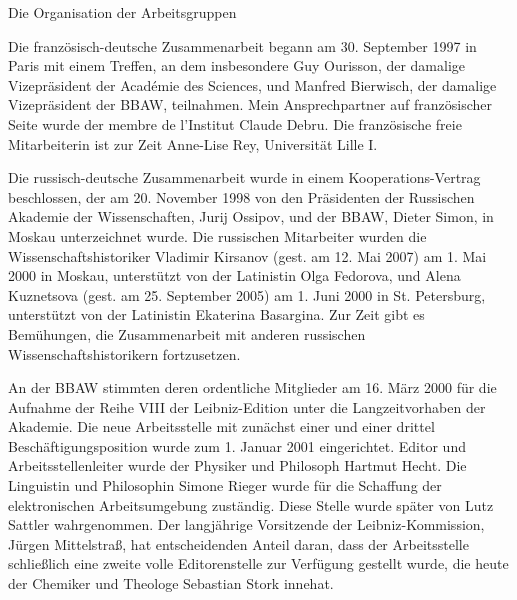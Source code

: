 Die Organisation der Arbeitsgruppen\par\vspace{1.0ex}
Die franz\"{o}sisch-deutsche Zusammenarbeit begann am 30. September 1997 in Paris mit einem Treffen, an dem insbesondere Guy Ourisson, der damalige Vizepr\"{a}sident der Acad\'{e}mie des Sciences, und Manfred Bierwisch, der damalige Vizepr\"{a}sident der BBAW, teilnahmen. Mein Ansprechpartner auf franz\"{o}sischer Seite wurde der membre de l'Institut Claude Debru. Die franz\"{o}sische freie Mitarbeiterin ist zur Zeit Anne-Lise Rey, Universit\"{a}t Lille I.\par
Die russisch-deutsche Zusammenarbeit wurde in einem Kooperations-Ver\-trag beschlossen, der am 20. November 1998 von den Pr\"{a}sidenten der Russischen Akademie der Wissenschaften, Jurij Ossipov, und der BBAW, Dieter Simon, in Mos\-kau unterzeichnet wurde. Die russischen Mitarbeiter wurden die Wissenschafts\-historiker Vladimir Kirsanov (gest. am 12. Mai 2007) am 1. Mai 2000 in Moskau, unterst\"{u}tzt von der Latinistin Olga Fedorova, und Alena Kuznetsova (gest. am  25. September 2005) am 1. Juni 2000 in St. Petersburg, unterst\"{u}tzt von der Latinistin Ekaterina Basargina. Zur Zeit gibt es Bem\"{u}hungen, die Zusammenarbeit mit anderen russischen Wissenschaftshistorikern fortzusetzen.\par
An der BBAW stimmten deren ordentliche Mitglieder am 16. M\"{a}rz 2000 f\"{u}r die Aufnahme der Reihe VIII der Leibniz-Edition unter die Langzeitvorhaben der Akademie. Die neue Arbeitsstelle mit zun\"{a}chst einer und einer drittel Besch\"{a}ftigungsposition wurde zum 1. Januar 2001 eingerichtet. Editor und Arbeitsstellenleiter wurde der Physiker und Philosoph Hartmut Hecht. Die Linguistin und Philosophin Simone Rieger wurde f\"{u}r die Schaffung der elektronischen Arbeits\-umgebung zust\"{a}ndig. Diese Stelle wurde sp\"{a}ter von Lutz Sattler wahrgenommen. Der langj\"{a}hrige Vorsitzende der Leibniz-Kommission, J\"{u}rgen Mittelstra{\ss}, hat ent\-scheidenden Anteil daran, dass der Arbeitsstelle schlie{\ss}lich eine zweite volle Editorenstelle zur Verf\"{u}gung gestellt wurde, die heute der Chemiker und Theologe Sebastian Stork innehat.\par\vspace{2.0ex}

